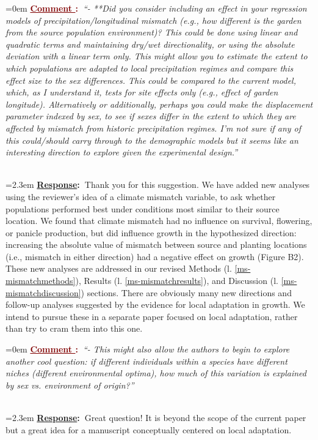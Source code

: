 \documentclass[12pt]{article}
\newcounter{cN}
\newcommand{\comment}[1]{
	\vspace{2em}
	\refstepcounter{cN} %
	\noindent \hangindent=0em \textbf{\textcolor{Maroon}{\uline{Comment \thecN}:~}}\emph{``#1''}
	}
\newcommand{\response}[1]{
	\\[0.25em]
	\hangindent=2.3em \textbf{\textcolor{NavyBlue}{\uline{Response}:~}}#1
	}
\begin{document}
\comment{- **Did you consider including an effect in your regression models of precipitation/longitudinal mismatch (e.g., how different is the garden from the source population environment)? This could be done using linear and quadratic terms and maintaining dry/wet directionality, or using the absolute deviation with a linear term only. This might allow you to estimate the extent to which populations are adapted to local precipitation regimes and compare this effect size to the sex differences. This could be compared to the current model, which, as I understand it, tests for site effects only (e.g., effect of garden longitude). Alternatively or additionally, perhaps you could make the displacement parameter indexed by sex, to see if sexes differ in the extent to which they are affected by mismatch from historic precipitation regimes. I'm not sure if any of this could/should carry through to the demographic models but it seems like an interesting direction to explore given the experimental design.}
\response{Thank you for this suggestion. We have added new analyses using the reviewer's idea of a climate mismatch variable, to ask whether populations performed best under conditions most similar to their source location. We found that climate mismatch had no influence on survival, flowering, or panicle production, but did influence growth in the hypothesized direction: increasing the absolute value of mismatch between source and planting locations (i.e., mismatch in either direction) had a negative effect on growth (Figure B2). These new analyses are addressed in our revised Methods (l. \ref{ms-mismatchmethods}), Results (l. \ref{ms-mismatchresults}), and Discussion (l. \ref{ms-mismatchdiscussion}) sections. There are obviously many new directions and follow-up analyses suggested by the evidence for local adaptation in growth. We intend to pursue these in a separate paper focused on local adaptation, rather than try to cram them into this one.}
	
\comment{- This might also allow the authors to begin to explore another cool question: if different individuals within a species have different niches (different environmental optima), how much of this variation is explained by sex vs. environment of origin?}
\response{Great question! It is beyond the scope of the current paper but a great idea for a manuscript conceptually centered on local adaptation.}
	
\end{document}
